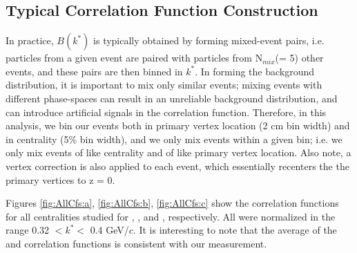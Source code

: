 \documentclass[../AnalysisNoteJBuxton.tex]{subfiles}
\begin{document}
\subsection{Typical Correlation Function Construction}
\label{TypicalCfConstruction}

In practice, $B(k^{*})$ is typically obtained by forming mixed-event pairs, i.e. particles from a given event are paired with particles from N$_{mix}$(= 5) other events, and these pairs are then binned in $k^{*}$.
In forming the background distribution, it is important to mix only similar events; mixing events with different phase-spaces can result in an unreliable background distribution, and can introduce artificial signals in the correlation function.
Therefore, in this analysis, we bin our events both in primary vertex location (2 cm bin width) and in centrality (5\% bin width), and we only mix events within a given bin; i.e. we only mix events of like centrality and of like primary vertex location.
Also note, a vertex correction is also applied to each event, which essentially recenters the the primary vertices to z = 0.

Figures \ref{fig:AllCfs:a}, \ref{fig:AllCfs:b}, \ref{fig:AllCfs:c} show the correlation functions for all centralities studied for \LamKchPALamKchM, \LamKchMALamKchP, and \LamALamKs, respectively. All were normalized in the range 0.32 $< k^{*} < $ 0.4 GeV/$c$.  It is interesting to note that the average of the \LamKchPALamKchM and \LamKchMALamKchP correlation functions is consistent with our \LamKsALamKs measurement. 
\end{document}
